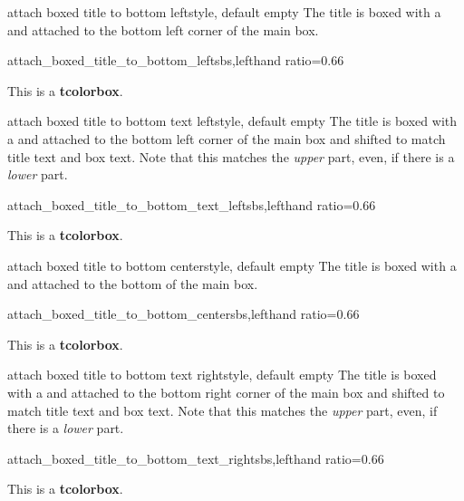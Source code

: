 \clearpage

\begin{docTcbKey}{attach boxed title to bottom left}{}{style, default empty}
The title is boxed with a  and attached to
the bottom left corner of the main box.
\begin{exdispExample*}{attach_boxed_title_to_bottom_left}{sbs,lefthand ratio=0.66}
\begin{tcolorbox}[enhanced,title=My title,
  attach boxed title to bottom left]
  This is a \textbf{tcolorbox}.
\end{tcolorbox}
\end{exdispExample*}
\end{docTcbKey}


\begin{docTcbKey}[][doc new=2021-07-30]{attach boxed title to bottom text left}{}{style, default empty}
The title is boxed with a  and attached to
the bottom left corner of the main box
and shifted to match title text and box text.
Note that this matches the \emph{upper} part, even, if there is a \emph{lower} part.
\begin{exdispExample*}{attach_boxed_title_to_bottom_text_left}{sbs,lefthand ratio=0.66}
\begin{tcolorbox}[enhanced,title=My title,
  attach boxed title to bottom text left]
  This is a \textbf{tcolorbox}.
\end{tcolorbox}
\end{exdispExample*}
\end{docTcbKey}


\begin{docTcbKey}{attach boxed title to bottom center}{}{style, default empty}
The title is boxed with a  and attached to
the bottom of the main box.
\begin{exdispExample*}{attach_boxed_title_to_bottom_center}{sbs,lefthand ratio=0.66}
\begin{tcolorbox}[enhanced,title=My title,
  attach boxed title to bottom center]
  This is a \textbf{tcolorbox}.
\end{tcolorbox}
\end{exdispExample*}
\end{docTcbKey}


\begin{docTcbKey}[][doc new=2021-07-30]{attach boxed title to bottom text right}{}{style, default empty}
The title is boxed with a  and attached to
the bottom right corner of the main box
and shifted to match title text and box text.
Note that this matches the \emph{upper} part, even, if there is a \emph{lower} part.
\begin{exdispExample*}{attach_boxed_title_to_bottom_text_right}{sbs,lefthand ratio=0.66}
\begin{tcolorbox}[enhanced,title=My title,
  halign=right,
  attach boxed title to bottom text right]
  This is a \textbf{tcolorbox}.
\end{tcolorbox}
\end{exdispExample*}
\end{docTcbKey}


